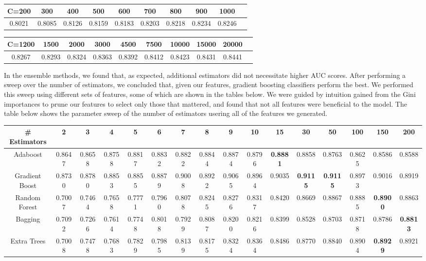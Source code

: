 \documentclass{article} %
\begin{document}
\begin{adjustbox}{width=\textwidth,totalheight=\textheight,keepaspectratio}
\begin{tabular}{cccccccccc}
C=200 & 300 & 400 & 500 & 600 & 700 & 800 & 900 & 1000 \\
\hline
0.8021 & 0.8085 & 0.8126 & 0.8159 & 0.8183 & 0.8203 & 0.8218 & 0.8234 & 0.8246
\end{tabular}
\end{adjustbox}

\begin{adjustbox}{width=\textwidth,totalheight=\textheight,keepaspectratio}
\begin{tabular}{cccccccccc}
C=1200 & 1500 & 2000 & 3000 & 4500 & 7500 & 10000 & 15000 & 20000\\
\hline
 0.8267 & 0.8293 & 0.8324 & 0.8363 & 0.8392 & 0.8412 & 0.8423 & 0.8431 & 0.8441
\end{tabular}
\end{adjustbox}

In the ensemble methods, we found that, as expected, additional estimators did
not necessitate higher AUC scores. After performing a sweep over the number of
estimators, we concluded that, given our features, gradient boosting classifiers
perform the best. We performed this sweep using different sets of features, some
of which are shown in the tables below. We were guided by intuition gained from the Gini
importances to prune our features to select only those that mattered, and found
that not all features were beneficial to the model. The table below shows the
parameter sweep of the number of estimators usering
all of the features we generated.

\begin{adjustbox}{width=\textwidth,totalheight=\textheight,keepaspectratio}
\begin{tabular}{c | c c c c c c c c c c c c c c c}
\# Estimators & 2 & 3 & 4 & 5 & 6 & 7 & 8 & 9 & 10 & 15 & 30 & 50 & 100 & 150 & 200\\
\hline
Adaboost & 0.8647 & 0.8658 & 0.8758 & 0.8817 & 0.8832 & 0.8822 & 0.8844 & 0.8874 & 0.8796 & \textbf{0.8881} & 0.8858 & 0.8763 & 0.8625 & 0.8586 & 0.8588\\
Gradient Boost & 0.8730 & 0.8780 & 0.8853 & 0.8855 & 0.8879 & 0.9008 & 0.8922 & 0.9065 & 0.8964 & 0.9035 & \textbf{0.9115} & \textbf{0.9115} & 0.8973 & 0.9016 & 0.8919\\
Random Forest & 0.7007 & 0.7464 & 0.7658 & 0.7771 & 0.7960 & 0.8078 & 0.8245 & 0.8276 & 0.8317 & 0.8420 & 0.8669 & 0.8867 & 0.8885 & \textbf{0.8900} & 0.8863\\
Bagging & 0.7092 & 0.7266 & 0.7614 & 0.7748 & 0.8018 & 0.7929 & 0.8087 & 0.8200 & 0.8216 & 0.8399 & 0.8528 & 0.8703 & 0.8718 & 0.8786 & \textbf{0.8813}\\
Extra Trees & 0.7008 & 0.7478 & 0.7683 & 0.7829 & 0.7985 & 0.8139 & 0.8175 & 0.8324 & 0.8364 & 0.8486 & 0.8770 & 0.8840 & 0.8904 & \textbf{0.8929} & 0.8921
\end{tabular}
\end{adjustbox}
\end{document}
